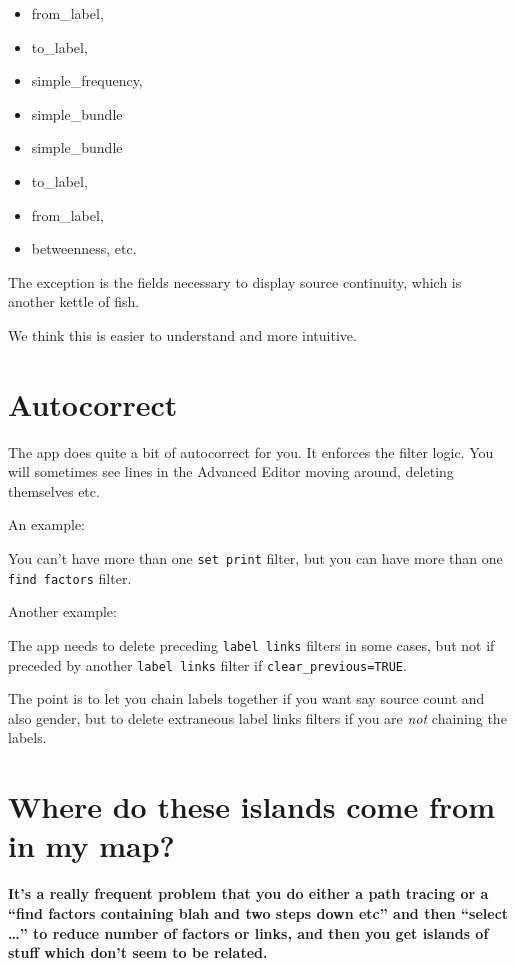 \documentclass[
]{book}
\providecommand{\tightlist}{%
  \setlength{\itemsep}{0pt}\setlength{\parskip}{0pt}}
\begin{document}
\begin{itemize}
\tightlist
\item
  from\_label,
\item
  to\_label,
\item
  simple\_frequency,
\item
  simple\_bundle
\item
  simple\_bundle
\item
  to\_label,
\item
  from\_label,
\item
  betweenness, etc.
\end{itemize}

The exception is the fields necessary to display source continuity, which is another kettle of fish.

We think this is easier to understand and more intuitive.

\hypertarget{xautocorrect}{%
\section{Autocorrect}\label{xautocorrect}}

The app does quite a bit of autocorrect for you. It enforces the filter logic. You will sometimes see lines in the Advanced Editor moving around, deleting themselves etc.

An example:

You can't have more than one \texttt{set\ print} filter, but you can have more than one \texttt{find\ factors} filter.

Another example:

The app needs to delete preceding \texttt{label\ links} filters in some cases, but not if preceded by another \texttt{label\ links} filter if \texttt{clear\_previous=TRUE}.

The point is to let you chain labels together if you want say source count and also gender, but to delete extraneous label links filters if you are \emph{not} chaining the labels.

\hypertarget{where-do-these-islands-come-from-in-my-map}{%
\section{Where do these islands come from in my map?}\label{where-do-these-islands-come-from-in-my-map}}

\textbf{It's a really frequent problem that you do either a path tracing or a ``find factors containing blah and two steps down etc'' and then ``select \ldots{}'' to reduce number of factors or links, and then you get islands of stuff which don't seem to be related.}
\end{document}
